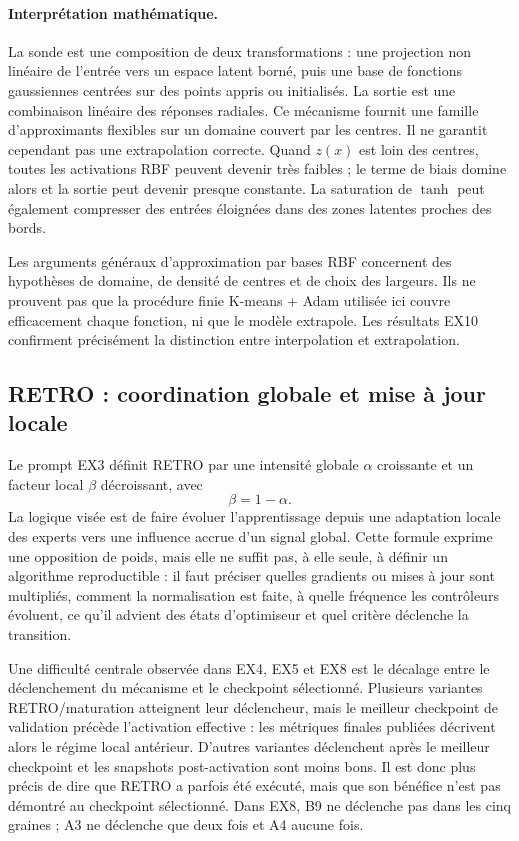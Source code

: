 \documentclass[11pt,a4paper]{article}
\begin{document}
\paragraph{Interprétation mathématique.} La sonde est une composition de deux transformations : une projection non linéaire de l'entrée vers un espace latent borné, puis une base de fonctions gaussiennes centrées sur des points appris ou initialisés. La sortie est une combinaison linéaire des réponses radiales. Ce mécanisme fournit une famille d'approximants flexibles sur un domaine couvert par les centres. Il ne garantit cependant pas une extrapolation correcte. Quand \(z(x)\) est loin des centres, toutes les activations RBF peuvent devenir très faibles ; le terme de biais domine alors et la sortie peut devenir presque constante. La saturation de \(\tanh\) peut également compresser des entrées éloignées dans des zones latentes proches des bords.

Les arguments généraux d'approximation par bases RBF concernent des hypothèses de domaine, de densité de centres et de choix des largeurs. Ils ne prouvent pas que la procédure finie K-means + Adam utilisée ici couvre efficacement chaque fonction, ni que le modèle extrapole. Les résultats EX10 confirment précisément la distinction entre interpolation et extrapolation.

\subsection{RETRO : coordination globale et mise à jour locale}

Le prompt EX3 définit RETRO par une intensité globale \(\alpha\) croissante et un facteur local \(\beta\) décroissant, avec
\[
\beta=1-\alpha.
\]
La logique visée est de faire évoluer l'apprentissage depuis une adaptation locale des experts vers une influence accrue d'un signal global. Cette formule exprime une opposition de poids, mais elle ne suffit pas, à elle seule, à définir un algorithme reproductible : il faut préciser quelles gradients ou mises à jour sont multipliés, comment la normalisation est faite, à quelle fréquence les contrôleurs évoluent, ce qu'il advient des états d'optimiseur et quel critère déclenche la transition.

Une difficulté centrale observée dans EX4, EX5 et EX8 est le décalage entre le déclenchement du mécanisme et le checkpoint sélectionné. Plusieurs variantes RETRO/maturation atteignent leur déclencheur, mais le meilleur checkpoint de validation précède l'activation effective : les métriques finales publiées décrivent alors le régime local antérieur. D'autres variantes déclenchent après le meilleur checkpoint et les snapshots post-activation sont moins bons. Il est donc plus précis de dire que RETRO a parfois été exécuté, mais que son bénéfice n'est pas démontré au checkpoint sélectionné. Dans EX8, B9 ne déclenche pas dans les cinq graines ; A3 ne déclenche que deux fois et A4 aucune fois.
\end{document}
